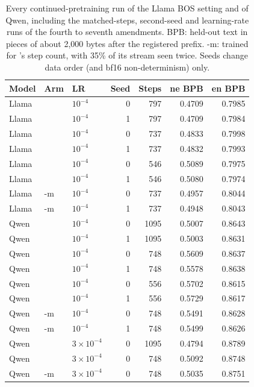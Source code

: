 \begin{table}[!htb]
\centering\small
\setlength{\tabcolsep}{2pt}
\begin{tabular}{lllrrrr}
\toprule
Model & Arm & LR & Seed & Steps & ne BPB & en BPB \\
\midrule
Llama & \RO{} & $10^{-4}$ & 0 & 797 & 0.4709 & 0.7985 \\
Llama & \RO{} & $10^{-4}$ & 1 & 797 & 0.4709 & 0.7984 \\
Llama & \RI{} & $10^{-4}$ & 0 & 737 & 0.4833 & 0.7998 \\
Llama & \RI{} & $10^{-4}$ & 1 & 737 & 0.4832 & 0.7993 \\
Llama & \RII{} & $10^{-4}$ & 0 & 546 & 0.5089 & 0.7975 \\
Llama & \RII{} & $10^{-4}$ & 1 & 546 & 0.5080 & 0.7974 \\
Llama & \RII{}-m & $10^{-4}$ & 0 & 737 & 0.4957 & 0.8044 \\
Llama & \RII{}-m & $10^{-4}$ & 1 & 737 & 0.4948 & 0.8043 \\
\midrule
Qwen & \RO{} & $10^{-4}$ & 0 & 1095 & 0.5007 & 0.8643 \\
Qwen & \RO{} & $10^{-4}$ & 1 & 1095 & 0.5003 & 0.8631 \\
Qwen & \RI{} & $10^{-4}$ & 0 & 748 & 0.5609 & 0.8637 \\
Qwen & \RI{} & $10^{-4}$ & 1 & 748 & 0.5578 & 0.8638 \\
Qwen & \RII{} & $10^{-4}$ & 0 & 556 & 0.5702 & 0.8615 \\
Qwen & \RII{} & $10^{-4}$ & 1 & 556 & 0.5729 & 0.8617 \\
Qwen & \RII{}-m & $10^{-4}$ & 0 & 748 & 0.5491 & 0.8628 \\
Qwen & \RII{}-m & $10^{-4}$ & 1 & 748 & 0.5499 & 0.8626 \\
Qwen & \RO{} & $3{\times}10^{-4}$ & 0 & 1095 & 0.4794 & 0.8789 \\
Qwen & \RI{} & $3{\times}10^{-4}$ & 0 & 748 & 0.5092 & 0.8748 \\
Qwen & \RII{}-m & $3{\times}10^{-4}$ & 0 & 748 & 0.5035 & 0.8751 \\
\bottomrule
\end{tabular}
\caption{Every continued-pretraining run of the Llama BOS setting and of Qwen, including the matched-steps, second-seed and learning-rate runs of the fourth to seventh amendments. BPB: held-out text in pieces of about 2{,}000 bytes after the registered prefix. \RII{}-m: \RII{} trained for \RI{}'s step count, with 35\% of its stream seen twice. Seeds change data order (and bf16 non-determinism) only.}
\label{tab:extra-runs}
\end{table}
